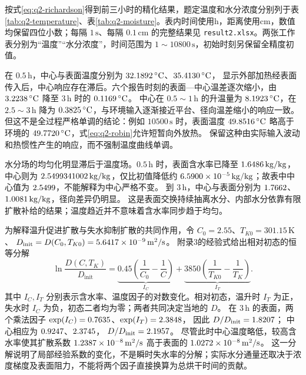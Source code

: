 按式\eqref{eq:q2-richardson}得到前三小时的精化结果，题定温度和水分浓度分别列于表\ref{tab:q2-temperature}、表\ref{tab:q2-moisture}。表内时间使用h，距离使用cm，数值均保留四位小数；每隔 \(1\,\mathrm s\)、每隔 \(0.1\,\mathrm{cm}\) 的完整结果见 \texttt{result2.xlsx}。两张工作表分别为“温度”“水分浓度”，时间范围为 \(1\sim10800\,\mathrm s\)，初始时刻另保留全精度初值。




在 \(0.5\,\mathrm h\)，中心与表面温度分别为
\(32.1892\,^{\circ}\mathrm C\)、\(35.4130\,^{\circ}\mathrm C\)，
显示外部加热经表面传入后，中心响应存在滞后。六个报告时刻的表面—中心温差逐次缩小，由
\(3.2238\,^{\circ}\mathrm C\) 降至 \(3\,\mathrm h\) 时的
\(0.1169\,^{\circ}\mathrm C\)。
中心在 \(0.5\sim1\,\mathrm h\) 的升温量为
\(8.1923\,^{\circ}\mathrm C\)，在 \(2.5\sim3\,\mathrm h\) 降为
\(0.3825\,^{\circ}\mathrm C\)，与环境输入逐渐接近平台、径向温差缩小的响应一致。
但这不是全过程严格单调的结论：例如 \(10500\,\mathrm s\) 时，表面温度
\(49.8516\,^{\circ}\mathrm C\) 略高于环境的
\(49.7720\,^{\circ}\mathrm C\)，式\eqref{eq:q2-robin}允许短暂向外放热。
保留这种由实际输入波动和热惯性产生的响应，而不强制温度曲线单调。

水分场的均匀化明显滞后于温度场。\(0.5\,\mathrm h\) 时，表面含水率已降至
\(1.6486\,\mathrm{kg/kg}\)，中心则为
\(2.5499341002\,\mathrm{kg/kg}\)，仅比初值降低约
\(6.5900\times10^{-5}\,\mathrm{kg/kg}\)；故表中中心值为
\(2.5499\)，不能解释为中心严格不变。
到 \(3\,\mathrm h\)，中心与表面分别为
\(1.7662\)、\(1.0081\,\mathrm{kg/kg}\)，径向差异仍明显。
这是表面交换持续抽离水分、内部水分依靠有限扩散补给的结果；温度趋近并不意味着含水率同步趋于均匀。

为解释温升促进扩散与失水抑制扩散的共同作用，令
\(C_0=2.55\)、\(T_{K0}=301.15\,\mathrm K\)、
\(D_{\mathrm{init}}=D(C_0,T_{K0})=5.6417\times10^{-9}\,\mathrm{m^2/s}\)。
附录3的经验式给出相对初态的恒等分解
\begin{equation}
\ln\frac{D(C,T_K)}{D_{\mathrm{init}}}
=\underbrace{0.45\left(\frac1{C_0}-\frac1C\right)}_{I_C}
+\underbrace{3850\left(\frac1{T_{K0}}-\frac1{T_K}\right)}_{I_T}.
\label{eq:q2-log-decomposition}
\end{equation}
其中 \(I_C,I_T\) 分别表示含水率、温度因子的对数变化。相对初态，温升时 \(I_T\) 为正，失水时 \(I_C\) 为负，初态二者均为零；两者共同决定当地的 \(D\)。
在 \(3\,\mathrm h\) 的表面，两个乘法因子
\(\exp(I_C)=0.7635\)、\(\exp(I_T)=2.3848\)，
因此 \(D/D_{\mathrm{init}}=1.8207\)；
中心相应为 \(0.9247\)、\(2.3745\)，
\(D/D_{\mathrm{init}}=2.1957\)。
尽管此时中心温度略低，较高含水率使其扩散系数
\(1.2387\times10^{-8}\,\mathrm{m^2/s}\) 高于表面的
\(1.0272\times10^{-8}\,\mathrm{m^2/s}\)。
这一分解说明了局部经验系数的变化，不是瞬时失水率的分解；实际水分通量还取决于浓度梯度及表面阻力，不能将两个因子直接换算为总烘干时间的贡献。

